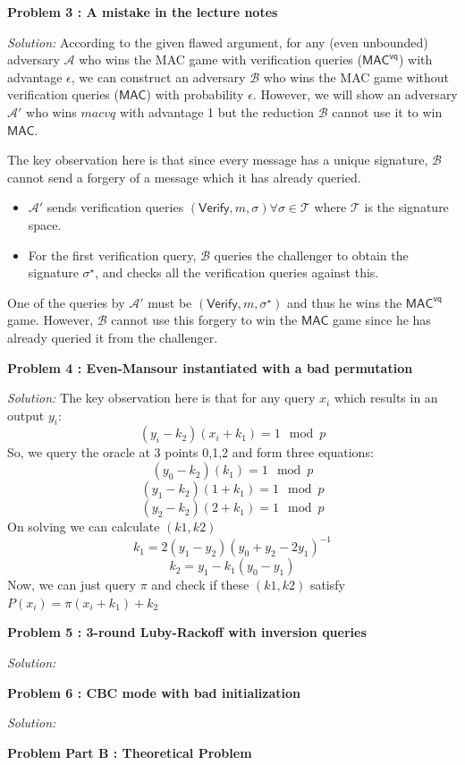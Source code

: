 \documentclass[a4paper, 11pt]{article}
\newenvironment{solution}
    {\textit{Solution:}}
    {\clearpage}
\newcommand{\prob}[1]{\begin{mdframed}[backgroundcolor=gray!20] \textbf{Problem #1}\end{mdframed}}
\newcommand{\verify}{\mathsf{Verify}}
\newcommand{\macvq}{\mathsf{MAC^{vq}}}
\newcommand{\mac}{\mathsf{MAC}}
\newcommand{\calA}{\mathcal{A}}
\newcommand{\calB}{\mathcal{B}}
\newcommand{\calT}{\mathcal{T}}
\begin{document}
\prob{3 : A mistake in the lecture notes}
\begin{solution}
    According to the given flawed argument, for any (even unbounded) adversary $\calA$ who wins the MAC game with verification queries ($\macvq$) with advantage $\epsilon$, we can construct an adversary $\calB$ who wins the MAC game without verification queries ($\mac$) with probability $\epsilon$. However, we will show an adversary $\calA'$ who wins  $macvq$ with advantage 1 but the reduction $\calB$ cannot use it to win $\mac$.

    The key observation here is that since every message has a unique signature, $\calB$ cannot send a forgery of a message which it has already queried. 
    \begin{itemize}
        \item $\calA'$ sends verification queries $(\verify , m, \sigma) \forall \sigma\in\calT$ where $\calT$ is the signature space.
        \item For the first verification query, $\calB$ queries the challenger to obtain the signature $\sigma^\star$, and checks all the verification queries against this.
    \end{itemize} 
    One of the queries by $\calA'$ must be $(\verify , m, \sigma^\star)$ and thus he wins the $\macvq$ game. However, $\calB$ cannot use this forgery to win the $\mac$ game since he has already queried it from the challenger.

\end{solution}


\prob{4 : Even-Mansour instantiated with a bad permutation}
\begin{solution}
   The key observation here is that for any query $x_i$ which results in an output $y_i$:
   $$(y_i-k_2)(x_i+k_1)=1 \mod p$$
   So, we query the oracle at 3 points 0,1,2 and form three equations:
   $$(y_0-k_2)(k_1)=1 \mod p$$
   $$(y_1-k_2)(1+k_1)=1 \mod p$$
   $$(y_2-k_2)(2+k_1)=1 \mod p$$
   On solving we can calculate $(k1,k2)$
   $$k_1=2(y_1-y_2)(y_0+y_2-2y_1)^{-1}$$
   $$k_2=y_1-k_1(y_0-y_1)$$
   Now, we can just query $\pi$ and check if these $(k1,k2)$ satisfy $P(x_i)=\pi(x_i+k_1)+k_2$
\end{solution}


\prob{5 : 3-round Luby-Rackoff with inversion queries}
\begin{solution}
   
\end{solution}


\prob{6 : CBC mode with bad initialization}
\begin{solution}
   
\end{solution}


\prob{Part B : Theoretical Problem}
\end{document}
